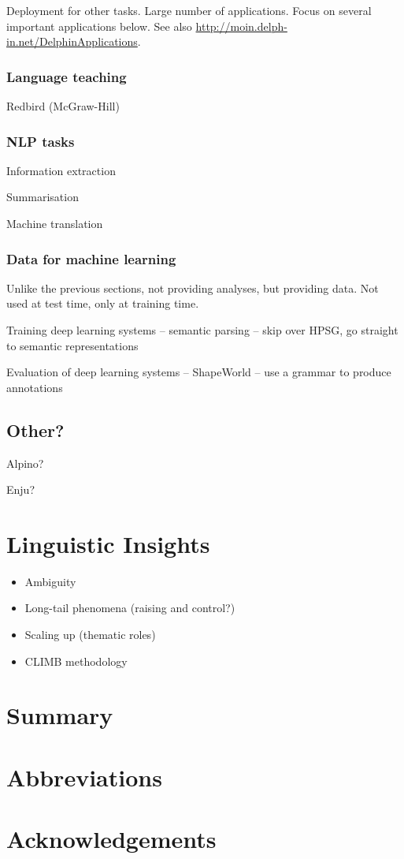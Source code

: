 \documentclass[output=paper]{langsci/langscibook}
\begin{document}
Deployment for other tasks.
Large number of applications.
Focus on several important applications below.
See also \url{http://moin.delph-in.net/DelphinApplications}.


\subsubsection{Language teaching}

Redbird (McGraw-Hill)


\subsubsection{NLP tasks}

Information extraction

Summarisation

Machine translation



\subsubsection{Data for machine learning}

Unlike the previous sections,
not providing analyses, but providing data.
Not used at test time, only at training time.

Training deep learning systems
-- semantic parsing
-- skip over HPSG, go straight to semantic representations

Evaluation of deep learning systems
-- ShapeWorld
-- use a grammar to produce annotations


\subsection{Other?}

Alpino?

Enju?



\section{Linguistic Insights}
\label{cl:insight}

\begin{itemize}
    \item Ambiguity %
    \item Long-tail phenomena (raising and control?) %
    \item Scaling up (thematic roles) %
    \item CLIMB methodology %
\end{itemize}

\section{Summary}

\section*{Abbreviations}
\section*{Acknowledgements}

\printbibliography[heading=subbibliography,notkeyword=this] 
\end{document}
